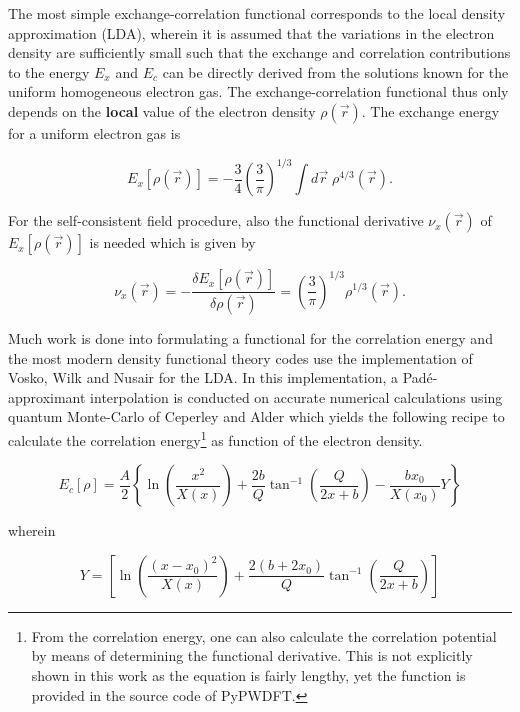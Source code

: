 The most simple exchange-correlation functional corresponds to the local density approximation (LDA), wherein it is assumed that the variations in the electron density are sufficiently small such that the exchange and correlation contributions to the energy $E_{x}$ and $E_{c}$ can be directly derived from the solutions known for the uniform homogeneous electron gas. The exchange-correlation functional thus only depends on the \textbf{local} value of the electron density $\rho(\vec{r})$. The exchange energy for a uniform electron gas is

\begin{equation}
E_{x}[\rho(\vec{r})] = -\frac{3}{4}\left(\frac{3}{\pi}\right)^{1/3} \int d\vec{r}\; \rho^{4/3}(\vec{r}).
\label{eq:chap04:slater_exchange}
\end{equation}

For the self-consistent field procedure, also the functional derivative $\nu_{x}(\vec{r})$ of $E_{x}[\rho(\vec{r})]$ is needed which is given by

\begin{equation}
\nu_{x}(\vec{r}) = -\frac{\delta E_{x}[\rho(\vec{r})]}{\delta \rho(\vec{r})} = \left(\frac{3}{\pi}\right)^{1/3} \rho^{1/3}(\vec{r}).
\end{equation}

Much work is done into formulating a functional for the correlation energy and the most modern density functional theory codes use the implementation of Vosko, Wilk and Nusair for the LDA. In this implementation, a Padé-approximant interpolation is conducted on accurate numerical calculations using quantum Monte-Carlo of Ceperley and Alder which yields the following recipe to calculate the correlation energy\footnote{From the correlation energy, one can also calculate the correlation potential by means of determining the functional derivative. This is not explicitly shown in this work as the equation is fairly lengthy, yet the function is provided in the source code of PyPWDFT.} as function of the electron density.\cite{1980:vosko,1980:ceperley}

\begin{equation}
E_{c}[\rho] = \frac{A}{2} \left\{ \ln \left( \frac{x^{2}}{X(x)} \right) + \frac{2b}{Q} \tan^{-1} \left( \frac{Q}{2x+b} \right) -\frac{bx_{0}}{X(x_{0})} Y \right\}
\label{eq:vwn5}
\end{equation}

wherein

\begin{equation}
    Y = \left[ \ln \left( \frac{(x-x_{0})^{2}}{X(x)} \right) + \frac{2(b+2x_{0})}{Q} \tan^{-1} \left( \frac{Q}{2x+b} \right) \right]
\end{equation}

